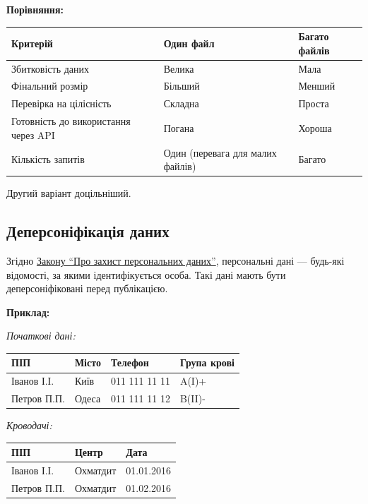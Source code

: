 \textbf{Порівняння:}

\begin{tabular}{|l|l|l|}
\hline
Критерій                           & Один файл                                                & Багато файлів                        \\
\hline
Збитковість даних                   & Велика                                                  & Мала                                 \\
Фінальний розмір                    & Більший                                                 & Менший                               \\
Перевірка на цілісність             & Складна                                                 & Проста                               \\
Готовність до використання через API & Погана                                                  & Хороша                               \\
Кількість запитів                   & Один (перевага для малих файлів)                        & Багато                               \\
\hline
\end{tabular}

Другий варіант доцільніший.

\subsection{Деперсоніфікація даних}

Згідно \href{http://zakon3.rada.gov.ua/laws/show/2297-17}{Закону “Про захист персональних даних”}, персональні дані — будь-які відомості, за якими ідентифікується особа. Такі дані мають бути деперсоніфіковані перед публікацією.

\textbf{Приклад:}

\textit{Початкові дані:}

\begin{tabular}{|l|l|l|l|}
\hline
ПІП         & Місто & Телефон      & Група крові \\
\hline
Іванов І.І. & Київ  & 011 111 11 11& A(I)+       \\
Петров П.П. & Одеса & 011 111 11 12& B(II)-      \\
\hline
\end{tabular}

\textit{Кроводачі:}

\begin{tabular}{|l|l|l|}
\hline
ПІП         & Центр    & Дата       \\
\hline
Іванов І.І. & Охматдит & 01.01.2016 \\
Петров П.П. & Охматдит & 01.02.2016 \\
\hline
\end{tabular}

